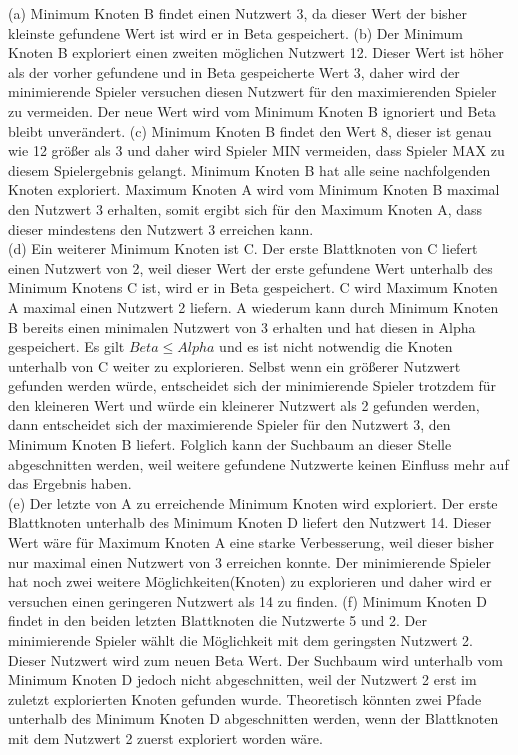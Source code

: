 (a) Minimum Knoten B findet einen Nutzwert 3, da dieser Wert der bisher kleinste gefundene Wert ist wird er in Beta gespeichert. (b) Der Minimum Knoten B exploriert einen zweiten möglichen Nutzwert 12. Dieser Wert ist höher als der vorher gefundene und in Beta gespeicherte Wert 3, daher wird der minimierende Spieler versuchen diesen Nutzwert für den maximierenden Spieler zu vermeiden. Der neue Wert wird vom Minimum Knoten B ignoriert und Beta bleibt unverändert. (c) Minimum Knoten B findet den Wert 8, dieser ist genau wie 12 größer als 3 und daher wird Spieler MIN vermeiden, dass Spieler MAX zu diesem Spielergebnis gelangt. Minimum Knoten B hat alle seine nachfolgenden Knoten exploriert. Maximum Knoten A wird vom Minimum Knoten B maximal den Nutzwert 3 erhalten, somit ergibt sich für den Maximum Knoten A, dass dieser mindestens den Nutzwert 3 erreichen kann. \\

(d) Ein weiterer Minimum Knoten ist C. Der erste Blattknoten von C liefert einen Nutzwert von 2, weil dieser Wert der erste gefundene Wert unterhalb des Minimum Knotens C ist, wird er in Beta gespeichert. C wird Maximum Knoten A maximal einen Nutzwert 2 liefern. A wiederum kann durch Minimum Knoten B bereits einen minimalen Nutzwert von 3 erhalten und hat diesen in Alpha gespeichert. Es gilt $Beta \leq Alpha$ und es ist nicht notwendig die Knoten unterhalb von C weiter zu explorieren. Selbst wenn ein größerer Nutzwert gefunden werden würde, entscheidet sich der minimierende Spieler trotzdem für den kleineren Wert und würde ein kleinerer Nutzwert als 2 gefunden werden, dann entscheidet sich der maximierende Spieler für den Nutzwert 3, den Minimum Knoten B liefert. Folglich kann der Suchbaum an dieser Stelle abgeschnitten werden, weil weitere gefundene Nutzwerte keinen Einfluss mehr auf das Ergebnis haben. \\

(e) Der letzte von A zu erreichende Minimum Knoten wird exploriert. Der erste Blattknoten unterhalb des Minimum Knoten D liefert den Nutzwert 14. Dieser Wert wäre für Maximum Knoten A eine starke Verbesserung, weil dieser bisher nur maximal einen Nutzwert von 3 erreichen konnte. Der minimierende Spieler hat noch zwei weitere Möglichkeiten(Knoten) zu explorieren und daher wird er versuchen einen geringeren Nutzwert als 14 zu finden. (f) Minimum Knoten D findet in den beiden letzten Blattknoten die Nutzwerte 5 und 2. Der minimierende Spieler wählt die Möglichkeit mit dem geringsten Nutzwert 2. Dieser Nutzwert wird zum neuen Beta Wert. Der Suchbaum wird unterhalb vom Minimum Knoten D jedoch nicht abgeschnitten, weil der Nutzwert 2 erst im zuletzt explorierten Knoten gefunden wurde. Theoretisch könnten zwei Pfade unterhalb des Minimum Knoten D abgeschnitten werden, wenn der Blattknoten mit dem Nutzwert 2 zuerst exploriert worden wäre.

